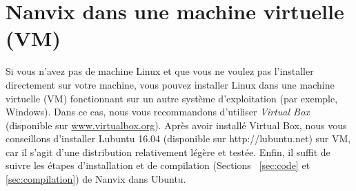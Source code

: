 \documentclass[11pt]{article}
\begin{document}
\section{Nanvix dans une machine virtuelle (VM)}
\label{sec:vm}

Si vous n'avez pas de machine Linux et que vous ne voulez pas
l'installer directement sur votre machine, vous pouvez installer Linux
dans une machine virtuelle (VM) fonctionnant sur un autre système
d'exploitation (par exemple, Windows). Dans ce cas, nous vous
recommandons d'utiliser \textit {Virtual Box} (disponible sur
\url{www.virtualbox.org}). Après avoir installé Virtual Box, nous vous
conseillons d'installer Lubuntu 16.04 (disponible sur
http://lubuntu.net) sur VM, car il s'agit d'une distribution
relativement légère et testée. Enfin, il suffit de suivre les étapes
d'installation et de compilation (Sections ~\ref{sec:code} et
\ref {sec:compilation}) de Nanvix dans Ubuntu.
\end{document}
